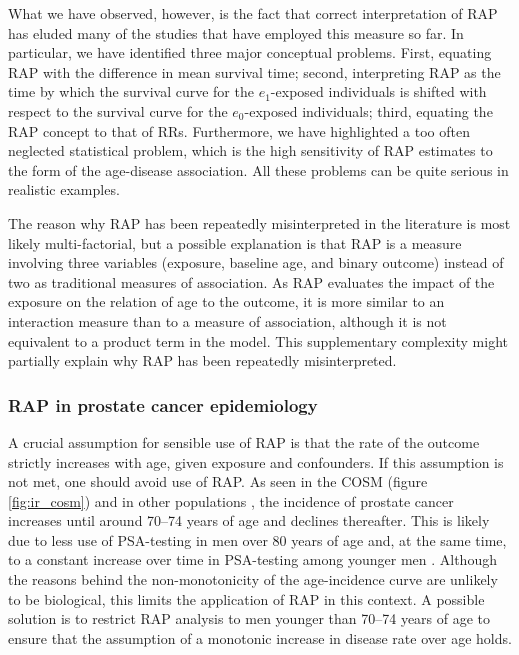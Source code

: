 What we have observed, however, is the fact that correct interpretation of RAP has eluded many of the studies that have employed this measure so far. In particular, we have identified three major conceptual problems. First, equating RAP with the difference in mean survival time; second, interpreting RAP as the time by which the survival curve for the $e_1$-exposed individuals is shifted with respect to the survival curve for the $e_0$-exposed individuals; third, equating the RAP concept to that of RRs. Furthermore, we have highlighted a too often neglected statistical problem, which is the high sensitivity of RAP estimates to the form of the age-disease association. All these problems can be quite serious in realistic examples.

The reason why RAP has been repeatedly misinterpreted  in the literature is most likely multi-factorial, but a possible explanation is that RAP is a measure involving three variables (exposure, baseline age, and binary outcome) instead of two as traditional measures of association. As RAP evaluates the impact of the exposure on the relation of age to the outcome, it is more similar to an interaction measure than to a measure of association, although it is not equivalent to a product term in the model. This supplementary complexity might partially explain why RAP has been repeatedly misinterpreted.

\subsubsection{RAP in prostate cancer epidemiology} 

A crucial assumption for sensible use of RAP is that the rate of the outcome strictly increases with age, given exposure and confounders. If this assumption is not met, one should avoid use of RAP. As seen in the COSM  (figure \ref{fig:ir_cosm}) and in other populations \citep{ferlay_cancer_2015}, the incidence of prostate cancer  increases until around 70--74 years of age and declines thereafter. This is likely due to less use of PSA-testing in men over 80 years of age \citep{williams_prostatespecific_2011} and, at the same time, to a constant increase over time in PSA-testing among younger men   \citep{salinas_prostate_2014}. Although the reasons behind the non-monotonicity of the age-incidence curve are unlikely to be biological, this limits  the application of RAP in this context. A possible solution is to restrict RAP analysis to men younger than 70--74 years of age to ensure that the assumption of a monotonic increase in disease rate over age holds.

